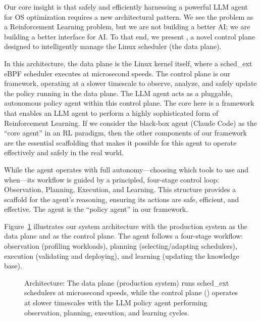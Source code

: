 Our core insight is that safely and efficiently harnessing a powerful LLM agent for OS optimization requires a new architectural pattern. We see the problem as a Reinforcement Learning problem, but we are not building a better AI; we are building a better interface for AI. To that end, we present \sys, a novel control plane designed to intelligently manage the Linux scheduler (the data plane).

In this architecture, the data plane is the Linux kernel itself, where a sched\_ext eBPF scheduler executes at microsecond speeds. The control plane is our framework, operating at a slower timescale to observe, analyze, and safely update the policy running in the data plane. The LLM agent acts as a pluggable, autonomous policy agent within this control plane. The core here is a framework that enables an LLM agent to perform a highly sophisticated form of Reinforcement Learning. If we consider the black-box agent (Claude Code) as the ``core agent'' in an RL paradigm, then the other components of our framework are the essential scaffolding that makes it possible for this agent to operate effectively and safely in the real world.

While the agent operates with full autonomy—choosing which tools to use and when—its workflow is guided by a principled, four-stage control loop: Observation, Planning, Execution, and Learning. This structure provides a scaffold for the agent's reasoning, ensuring its actions are safe, efficient, and effective. The agent is the ``policy agent'' in our framework.

Figure~\ref{fig:architecture} illustrates our system architecture with the production system as the data plane and \sys as the control plane. The agent follows a four-stage workflow: observation (profiling workloads), planning (selecting/adapting schedulers), execution (validating and deploying), and learning (updating the knowledge base).

\begin{figure}[h]
\centering
{}
\caption{\sys Architecture: The data plane (production system) runs sched\_ext schedulers at microsecond speeds, while the control plane (\sys) operates at slower timescales with the LLM policy agent performing observation, planning, execution, and learning cycles.}
\label{fig:architecture}
\end{figure}


